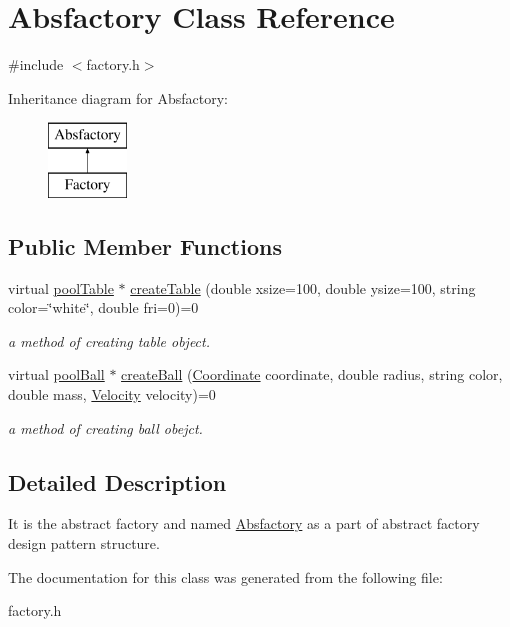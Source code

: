 \hypertarget{class_absfactory}{}\section{Absfactory Class Reference}
\label{class_absfactory}


{\ttfamily \#include $<$factory.\+h$>$}

Inheritance diagram for Absfactory\+:\begin{figure}[H]
\begin{center}
\leavevmode
\includegraphics[height=2.000000cm]{class_absfactory}
\end{center}
\end{figure}
\subsection*{Public Member Functions}
\begin{DoxyCompactItemize}
\item 
\mbox{\label{class_absfactory_a7a98426403d36416980f90323691df10}} 
virtual \mbox{\hyperlink{classpool_table}{pool\+Table}} $\ast$ \mbox{\hyperlink{class_absfactory_a7a98426403d36416980f90323691df10}{create\+Table}} (double xsize=100, double ysize=100, string color=\char`\"{}white\char`\"{}, double fri=0)=0
\begin{DoxyCompactList}\small\item\em a method of creating table object. \end{DoxyCompactList}\item 
\mbox{\label{class_absfactory_a69280d7c37d809c84b326f29f36b2804}} 
virtual \mbox{\hyperlink{classpool_ball}{pool\+Ball}} $\ast$ \mbox{\hyperlink{class_absfactory_a69280d7c37d809c84b326f29f36b2804}{create\+Ball}} (\mbox{\hyperlink{class_coordinate}{Coordinate}} coordinate, double radius, string color, double mass, \mbox{\hyperlink{class_velocity}{Velocity}} velocity)=0
\begin{DoxyCompactList}\small\item\em a method of creating ball obejct. \end{DoxyCompactList}\end{DoxyCompactItemize}


\subsection{Detailed Description}
It is the abstract factory and named \mbox{\hyperlink{class_absfactory}{Absfactory}} as a part of abstract factory design pattern structure. 

The documentation for this class was generated from the following file\+:\begin{DoxyCompactItemize}
\item 
factory.\+h\end{DoxyCompactItemize}
